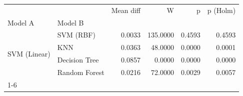 \begin{table}
\label{tab:Ext11_loso_wilcoxon_vs_linear_svm}
\begin{tabular}{llrrrr}
\toprule
 &  & Mean diff & W & p & p (Holm) \\
Model A & Model B &  &  &  &  \\
\midrule
\multirow[t]{4}{*}{SVM (Linear)} & SVM (RBF) & 0.0033 & 135.0000 & 0.4593 & 0.4593 \\
 & KNN & 0.0363 & 48.0000 & 0.0000 & 0.0001 \\
 & Decision Tree & 0.0857 & 0.0000 & 0.0000 & 0.0000 \\
 & Random Forest & 0.0216 & 72.0000 & 0.0029 & 0.0057 \\
\cline{1-6}
\bottomrule
\end{tabular}
\end{table}
